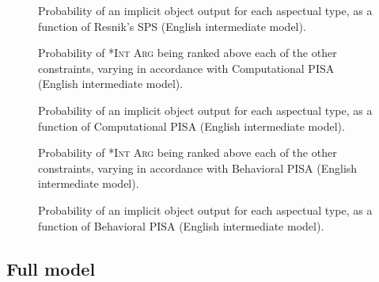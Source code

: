 \begin{figure}[htb]
\caption{Probability of an implicit object output for each aspectual type, as a function of Resnik's SPS (English intermediate model).}
    
\end{figure}



\begin{figure}[htb]
\caption{Probability of \textsc{*Int Arg} being ranked above each of the other constraints, varying in accordance with Computational PISA (English intermediate model).}
    
\end{figure}

\begin{figure}[htb]
\caption{Probability of an implicit object output for each aspectual type, as a function of Computational PISA (English intermediate model).}
    
\end{figure}



\begin{figure}[htb]
\caption{Probability of \textsc{*Int Arg} being ranked above each of the other constraints, varying in accordance with Behavioral PISA (English intermediate model).}
    
\end{figure}

\begin{figure}[htb]
\caption{Probability of an implicit object output for each aspectual type, as a function of Behavioral PISA (English intermediate model).}
    
\end{figure}



\subsection{Full model} 

